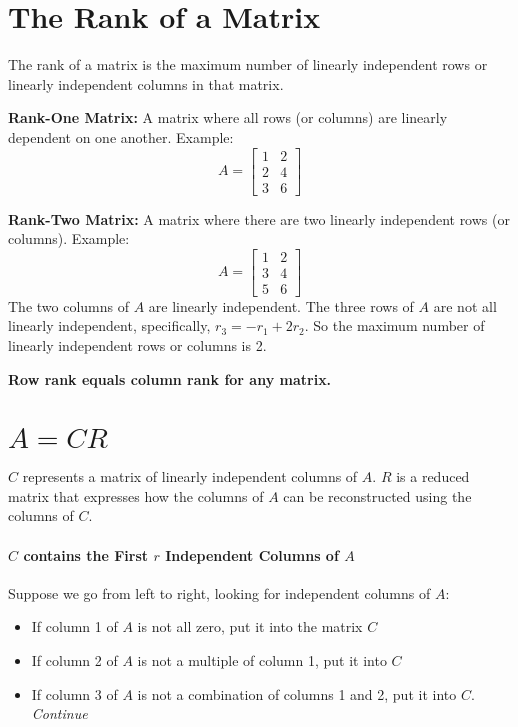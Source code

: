 \section{The Rank of a Matrix}

The rank of a matrix is the maximum number of linearly independent rows or linearly independent columns in that matrix.

\noindent \textbf{Rank-One Matrix:} A matrix where all rows (or columns) are linearly dependent on one another. Example:
\[
	A = \begin{bmatrix}
		1 & 2 \\
		2 & 4 \\
		3 & 6
	\end{bmatrix}
\]

\noindent\textbf{Rank-Two Matrix:} A matrix where there are two linearly independent rows (or columns). Example:
\[
	A = \begin{bmatrix}
		1 & 2 \\
		3 & 4 \\
		5 & 6
	\end{bmatrix}
\]
The two columns of $A$ are linearly independent. The three rows of $A$ are not all linearly independent, specifically, $r_3 = -r_1 + 2 r_2$. So the maximum number of linearly independent rows or columns is 2.

\begin{mdframed}
	\textbf{Row rank equals column rank for any matrix.}
\end{mdframed}


\section{$A = CR$}

$C$ represents a matrix of linearly independent columns of $A$. $R$ is a reduced matrix that expresses how the columns of $A$ can be reconstructed using the columns of $C$.

\paragraph{$C$ contains the First $r$ Independent Columns of $A$} Suppose we go from left to right, looking for independent columns of $A$:

\begin{itemize}
	\item If column 1 of $A$ is not all zero, put it into the matrix $C$
	\item If column 2 of $A$ is not a multiple of column 1, put it into $C$
	\item If column 3 of $A$ is not a combination of columns 1 and 2, put it into $C$. \textit{Continue}
\end{itemize}


